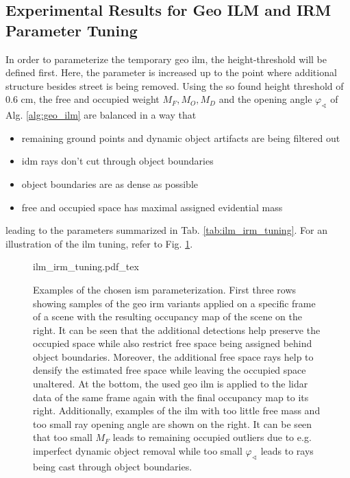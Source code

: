 \subsection{Experimental Results for Geo ILM and IRM Parameter Tuning}
\label{subsec:exp_results_params_ilm_irm}
In order to parameterize the temporary geo \gls{ilm}, the height-threshold will be defined first. Here, the parameter is increased up to the point where additional structure besides street is being removed. Using the so found height threshold of 0.6 cm, the free and occupied weight $M_F, M_O, M_D$ and the opening angle $\varphi_\sphericalangle$ of Alg. \ref{alg:geo_ilm} are balanced in a way that 
\begin{itemize}
	\item remaining ground points and dynamic object artifacts are being filtered out
	\item \gls{idm} rays don't cut through object boundaries
	\item object boundaries are as dense as possible
	\item free and occupied space has maximal assigned evidential mass
\end{itemize}
leading to the parameters summarized in Tab. \ref{tab:ilm_irm_tuning}. For an illustration of the \gls{ilm} tuning, refer to Fig. \ref{fig:ilm_irm_tuning}.
\begin{figure}[H]
	\begin{center}
		{ilm_irm_tuning.pdf_tex}
		\caption{\label{fig:ilm_irm_tuning}Examples of the chosen \gls{ism} parameterization. First three rows showing samples of the geo \gls{irm} variants applied on a specific frame of a scene with the resulting occupancy map of the scene on the right. It can be seen that the additional detections help preserve the occupied space while also restrict free space being assigned behind object boundaries. Moreover, the additional free space rays help to densify the estimated free space while leaving the occupied space unaltered. At the bottom, the used geo \gls{ilm} is applied to the lidar data of the same frame again with the final occupancy map to its right. Additionally, examples of the \gls{ilm} with too little free mass and too small ray opening angle are shown on the right. It can be seen that too small $M_F$ leads to remaining occupied outliers due to e.g. imperfect dynamic object removal while too small $\varphi_\sphericalangle$ leads to rays being cast through object boundaries.}
	\end{center}
\end{figure} 
